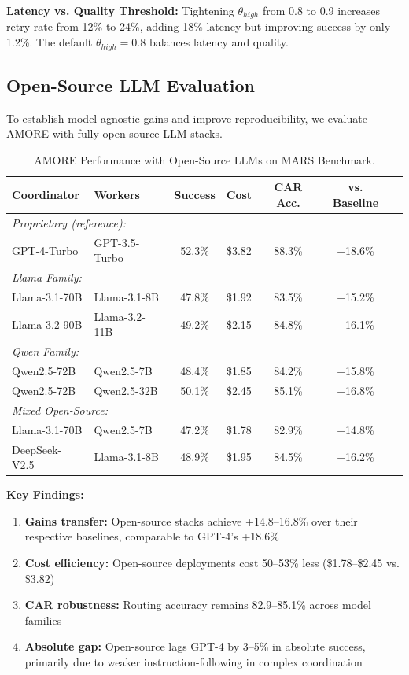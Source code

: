 \documentclass{article}
\theoremstyle{plain}
\theoremstyle{definition}
\theoremstyle{remark}
\begin{document}
\textbf{Latency vs. Quality Threshold:} Tightening $\theta_{high}$ from 0.8 to 0.9 increases retry rate from 12\% to 24\%, adding 18\% latency but improving success by only 1.2\%. The default $\theta_{high}=0.8$ balances latency and quality.

\subsection{Open-Source LLM Evaluation}
\label{sec:open_source_llms}

To establish model-agnostic gains and improve reproducibility, we evaluate AMORE with fully open-source LLM stacks.

\begin{table}[h]
	\caption{AMORE Performance with Open-Source LLMs on MARS Benchmark.}
	\label{tab:open_source_full}
	\centering
	\small
	\begin{tabular}{@{}llccccc@{}}
		\toprule
		\textbf{Coordinator} & \textbf{Workers} & \textbf{Success} & \textbf{Cost} & \textbf{CAR Acc.} & \textbf{vs. Baseline} \\
		\midrule
		\multicolumn{6}{l}{\textit{Proprietary (reference):}} \\
		GPT-4-Turbo & GPT-3.5-Turbo & 52.3\% & \$3.82 & 88.3\% & +18.6\% \\
		\midrule
		\multicolumn{6}{l}{\textit{Llama Family:}} \\
		Llama-3.1-70B & Llama-3.1-8B & 47.8\% & \$1.92 & 83.5\% & +15.2\% \\
		Llama-3.2-90B & Llama-3.2-11B & 49.2\% & \$2.15 & 84.8\% & +16.1\% \\
		\midrule
		\multicolumn{6}{l}{\textit{Qwen Family:}} \\
		Qwen2.5-72B & Qwen2.5-7B & 48.4\% & \$1.85 & 84.2\% & +15.8\% \\
		Qwen2.5-72B & Qwen2.5-32B & 50.1\% & \$2.45 & 85.1\% & +16.8\% \\
		\midrule
		\multicolumn{6}{l}{\textit{Mixed Open-Source:}} \\
		Llama-3.1-70B & Qwen2.5-7B & 47.2\% & \$1.78 & 82.9\% & +14.8\% \\
		DeepSeek-V2.5 & Llama-3.1-8B & 48.9\% & \$1.95 & 84.5\% & +16.2\% \\
		\bottomrule
	\end{tabular}
\end{table}

\textbf{Key Findings:}
\begin{enumerate}[nosep,leftmargin=*]
	\item \textbf{Gains transfer:} Open-source stacks achieve +14.8--16.8\% over their respective baselines, comparable to GPT-4's +18.6\%
	\item \textbf{Cost efficiency:} Open-source deployments cost 50--53\% less (\$1.78--\$2.45 vs. \$3.82)
	\item \textbf{CAR robustness:} Routing accuracy remains 82.9--85.1\% across model families
	\item \textbf{Absolute gap:} Open-source lags GPT-4 by 3--5\% in absolute success, primarily due to weaker instruction-following in complex coordination
\end{enumerate}
\end{document}
